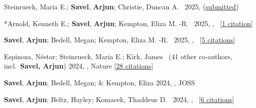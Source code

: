 



\item[] Steinrueck, Maria E.; \textbf{Savel}, \textbf{Arjun}; Christie, Duncan A. \etal\ 2025,    (\href{https://ui.adsabs.harvard.edu/abs/2025arXiv250921588S}{submitted})


\item[{\color{numcolor}\scriptsize47}] *Arnold, Kenneth E.; \textbf{Savel}, \textbf{Arjun}; Kempton, Eliza M. -R. \etal\ 2025, , \apj\ [\href{https://ui.adsabs.harvard.edu/abs/2025ApJ...986..187A}{1 citation}]

\item[{\color{numcolor}\scriptsize44}] \textbf{Savel}, \textbf{Arjun}; Bedell, Megan; Kempton, Eliza M. -R. \etal\ 2025, , \aj\ [\href{https://ui.adsabs.harvard.edu/abs/2025AJ....169..135S}{5 citations}]


\item[{\color{numcolor}\scriptsize37}] Espinoza, N{\'e}stor; Steinrueck, Maria E.; Kirk, James \etal\ ({41} other co-authors, incl.\ \textbf{Savel, Arjun}) 2024, , Nature [\href{https://ui.adsabs.harvard.edu/abs/2024Natur.632.1017E}{28 citations}]

\item[{\color{numcolor}\scriptsize35}] \textbf{Savel}, \textbf{Arjun}; Bedell, Megan; \& Kempton, Eliza 2024, , JOSS

\item[{\color{numcolor}\scriptsize33}] \textbf{Savel}, \textbf{Arjun}; Beltz, Hayley; Komacek, Thaddeus D. \etal\ 2024, , \apj\ [\href{https://ui.adsabs.harvard.edu/abs/2024ApJ...969L..27S}{6 citations}]



